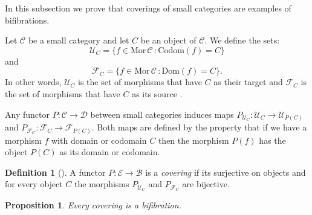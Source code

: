 \documentclass[12pt,reqno]{amsart}
\newtheorem{prop}[teo]{Proposition}
\theoremstyle{definition}
\newtheorem{defi}[teo]{Definition}
\theoremstyle{remark}
\numberwithin{figure}{section}%
\newcommand{\Ba}{\mathcal{B}}
\newcommand{\CC}{\mathcal{C}}
\newcommand{\D}{\mathcal{D}}
\newcommand{\E}{\mathcal{E}}
\begin{document}
In this subsection we prove that coverings of small categories are examples of bifibrations. 

Let $\CC$ be a small category and let $C$ be an object of $\CC$. We define the sets:
    $$\mathcal{U}_C=\{f \in \mathrm{Mor\, } \CC \, \colon \mathrm{Codom}(f)=C\}$$
    and
    $$\mathcal{F}_C=\{f \in \mathrm{Mor\, } \CC \, \colon \mathrm{Dom}(f)=C\}.$$
    In other words, $\mathcal{U}_C$ is the set of morphisms that have $C$ as their target and $\mathcal{F}_C$ is the set of morphisms that have $C$ as its  source . 



Any  functor  $P\colon \CC \to \D$ between small categories induces maps $P_{\mathcal{U}_C} \colon \mathcal{U}_C \rightarrow \mathcal{U}_{P(C)}$ and $P_{\mathcal{F}_C} \colon \mathcal{F}_C \rightarrow \mathcal{F}_{P(C)}$. Both maps are defined by the property that if we have a morphism $f$ with domain or codomain $C$ then the morphism $P(f)$ has the object $P(C)$ as its domain or codomain.   


\begin{defi}[\cite{BARMIN}]
    A functor $P \colon \E \rightarrow \Ba$ is a {\em covering} if its surjective on objects and for every object $C$ the morphisms $P_{\mathcal{U}_C}$ and $P_{\mathcal{F}_C}$ are bijective.
\end{defi}

\begin{prop}
   Every covering is a bifibration.
\end{prop}
\end{document}
